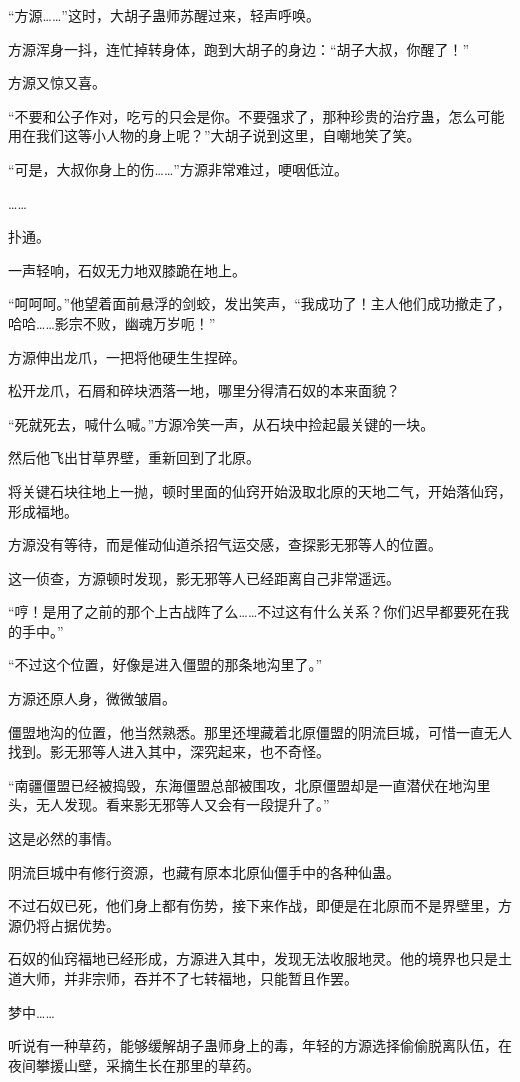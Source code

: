 \begin{this_body}
“方源……”这时，大胡子蛊师苏醒过来，轻声呼唤。

方源浑身一抖，连忙掉转身体，跑到大胡子的身边：“胡子大叔，你醒了！”

方源又惊又喜。

“不要和公子作对，吃亏的只会是你。不要强求了，那种珍贵的治疗蛊，怎么可能用在我们这等小人物的身上呢？”大胡子说到这里，自嘲地笑了笑。

“可是，大叔你身上的伤……”方源非常难过，哽咽低泣。

……

扑通。

一声轻响，石奴无力地双膝跪在地上。

“呵呵呵。”他望着面前悬浮的剑蛟，发出笑声，“我成功了！主人他们成功撤走了，哈哈……影宗不败，幽魂万岁呃！”

方源伸出龙爪，一把将他硬生生捏碎。

松开龙爪，石屑和碎块洒落一地，哪里分得清石奴的本来面貌？

“死就死去，喊什么喊。”方源冷笑一声，从石块中捡起最关键的一块。

然后他飞出甘草界壁，重新回到了北原。

将关键石块往地上一抛，顿时里面的仙窍开始汲取北原的天地二气，开始落仙窍，形成福地。

方源没有等待，而是催动仙道杀招气运交感，查探影无邪等人的位置。

这一侦查，方源顿时发现，影无邪等人已经距离自己非常遥远。

“哼！是用了之前的那个上古战阵了么……不过这有什么关系？你们迟早都要死在我的手中。”

“不过这个位置，好像是进入僵盟的那条地沟里了。”

方源还原人身，微微皱眉。

僵盟地沟的位置，他当然熟悉。那里还埋藏着北原僵盟的阴流巨城，可惜一直无人找到。影无邪等人进入其中，深究起来，也不奇怪。

“南疆僵盟已经被捣毁，东海僵盟总部被围攻，北原僵盟却是一直潜伏在地沟里头，无人发现。看来影无邪等人又会有一段提升了。”

这是必然的事情。

阴流巨城中有修行资源，也藏有原本北原仙僵手中的各种仙蛊。

不过石奴已死，他们身上都有伤势，接下来作战，即便是在北原而不是界壁里，方源仍将占据优势。

石奴的仙窍福地已经形成，方源进入其中，发现无法收服地灵。他的境界也只是土道大师，并非宗师，吞并不了七转福地，只能暂且作罢。

梦中……

听说有一种草药，能够缓解胡子蛊师身上的毒，年轻的方源选择偷偷脱离队伍，在夜间攀援山壁，采摘生长在那里的草药。


\end{this_body}
